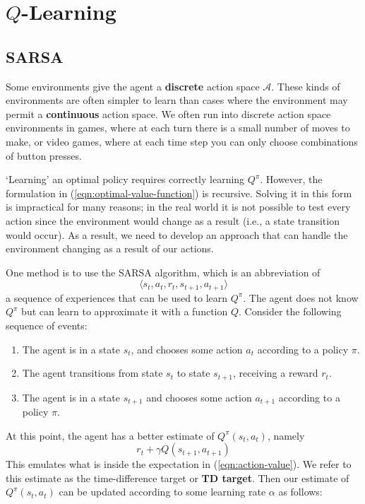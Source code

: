 \documentclass[journal, onecolumn, 12pt, draftclsnofoot]{IEEEtran}
\newcommand{\kword}[1]{\textbf{#1}}
\newcommand{\mc}[1]{\mathcal{#1}}
\begin{document}
		\newpage
		\section{$Q$-Learning}
		\label{sec:q-learning}
		\subsection{SARSA}
		\par Some environments give the agent a \kword{discrete} action space $\mc{A}$. These kinds of environments are often simpler to learn than cases where the environment may permit a \kword{continuous} action space. We often run into discrete action space environments in games, where at each turn there is a small number of moves to make, or video games, where at each time step you can only choose combinations of button presses.
		\par `Learning' an optimal policy requires correctly learning $Q^\pi$. However, the formulation in (\ref{eqn:optimal-value-function}) is recursive. Solving it in this form is impractical for many reasons; in the real world it is not possible to test every action since the environment would change as a result (i.e., a state transition would occur). As a result, we need to develop an approach that can handle the environment changing as a result of our actions.
		\par One method is to use the SARSA algorithm, which is an abbreviation of
		$$\langle s_t, a_t, r_t, s_{t+1}, a_{t+1} \rangle$$
		a sequence of experiences that can be used to learn $Q^\pi$. The agent does not know $Q^\pi$ but can learn to approximate it with a function $Q$. Consider the following sequence of events:
		\begin{enumerate}
			\item The agent is in a state $s_t$, and chooses some action $a_t$ according to a policy $\pi$.
			\item The agent transitions from state $s_t$ to state $s_{t+1}$, receiving a reward $r_t$.
			\item The agent is in a state $s_{t+1}$ and chooses some action $a_{t+1}$ according to a policy $\pi$.
		\end{enumerate}
		At this point, the agent has a better estimate of $Q^\pi (s_t, a_t)$, namely
		\begin{equation}
			\label{eqn:td_target}
			r_t + \gamma Q(s_{t+1}, a_{t+1})
		\end{equation}
		This emulates what is inside the expectation in (\ref{eqn:action-value}). We refer to this estimate as the time-difference target or \kword{TD target}. Then our estimate of $Q^\pi(s_t, a_t)$ can be updated according to some learning rate $\alpha$ as follows:
\end{document}
